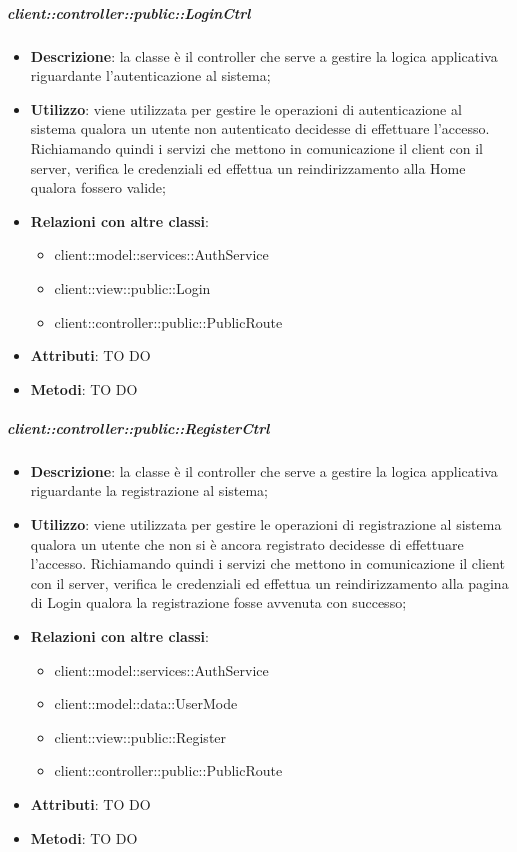 		\subparagraph{client::controller::public::LoginCtrl} %
		\label{subp:bdsm_app_client_controller_public_loginctrl}
			\begin{itemize}
				\item \textbf{Descrizione}: la classe è il controller che serve a gestire la logica applicativa riguardante l'autenticazione al sistema;
				\item \textbf{Utilizzo}: viene utilizzata per gestire le operazioni di autenticazione al sistema qualora un utente non autenticato decidesse di effettuare l'accesso. Richiamando quindi i servizi che mettono in comunicazione il client con il server, verifica le credenziali ed effettua un reindirizzamento alla Home qualora fossero valide;
				\item \textbf{Relazioni con altre classi}:
					\begin{itemize}
						\item client::model::services::AuthService
						\item client::view::public::Login
						\item client::controller::public::PublicRoute
					\end{itemize}
				\item \textbf{Attributi}: TO DO
				\item \textbf{Metodi}: TO DO
			\end{itemize}

		\subparagraph{client::controller::public::RegisterCtrl} %
		\label{subp:bdsm_app_client_controller_public_registerctrl}
			\begin{itemize}
				\item \textbf{Descrizione}: la classe è il controller che serve a gestire la logica applicativa riguardante la registrazione al sistema;
				\item \textbf{Utilizzo}: viene utilizzata per gestire le operazioni di registrazione al sistema qualora un utente che non si è ancora registrato decidesse di effettuare l'accesso. Richiamando quindi i servizi che mettono in comunicazione il client con il server, verifica le credenziali ed effettua un reindirizzamento alla pagina di Login qualora la registrazione fosse avvenuta con successo;
				\item \textbf{Relazioni con altre classi}:
					\begin{itemize}
						\item client::model::services::AuthService
						\item client::model::data::UserMode
						\item client::view::public::Register
						\item client::controller::public::PublicRoute
					\end{itemize}
				\item \textbf{Attributi}: TO DO
				\item \textbf{Metodi}: TO DO
			\end{itemize}

